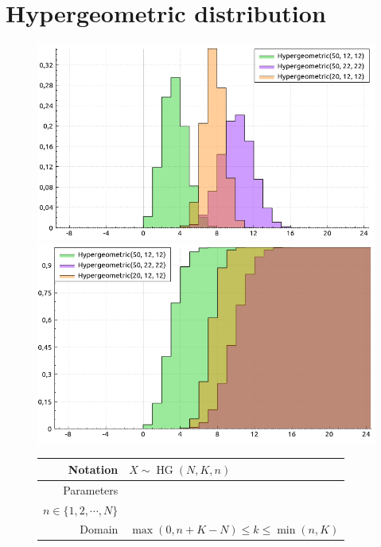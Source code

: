 \documentclass[a4paper,11pt]{article}
\theoremstyle{plain}
\theoremstyle{definition}
\newcommand{\MN}{\mathbb{N}}
\begin{document}
	\section{Hypergeometric distribution}
		\begin{figure}[!htb]\centering
			\begin{minipage}{0.55\textwidth}
				\includegraphics[width=\linewidth, right]{hypergeometric_pmf}
				\captionsetup{labelformat=empty}
				\includegraphics[width=\linewidth, right]{hypergeometric_cdf}
				\captionsetup{labelformat=empty}
			\end{minipage}
			\begin{minipage}{0.4\textwidth}
				\begin{tabular}{| r | l |}
					\hline
					Notation & $ X \sim \operatorname{HG}(N, K, n) $ \\
					\hline
					Parameters & 
					\pbox{\linewidth}{$ N \in \MN, K \in \{1, 2, \dotsm, N  \},$ \\ $n \in \{1, 2, \dotsm, N  \}$} \\
					\hline
					Domain & $ \max(0, n+K-N) \leq k \leq \min(n, K) $  \\

\end{tabular}
\end{minipage}
\end{figure}
\end{document}
